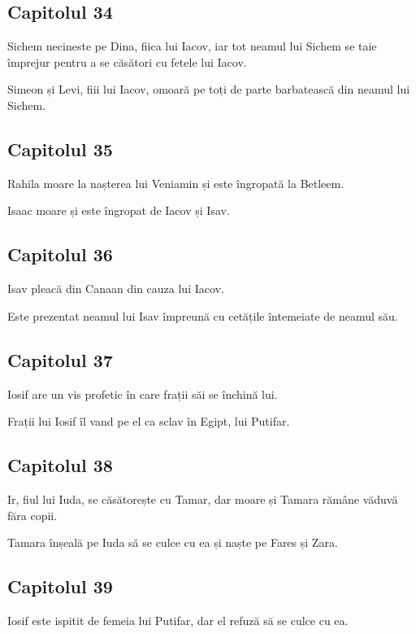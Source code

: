 \documentclass[12pt,a4paper]{article}
\begin{document}
\subsection{Capitolul 34}

Sichem necineste pe Dina, fiica lui Iacov, iar tot neamul lui Sichem se taie împrejur pentru a se căsători cu fetele lui Iacov.

Simeon și Levi, fiii lui Iacov, omoară pe toți de parte barbatească din neamul lui Sichem.

\subsection{Capitolul 35}

Rahila moare la nașterea lui Veniamin și este îngropată la Betleem.

Isaac moare și este îngropat de Iacov și Isav.

\subsection{Capitolul 36}

Isav pleacă din Canaan din cauza lui Iacov.

Este prezentat neamul lui Isav împreună cu cetățile întemeiate de neamul său.

\subsection{Capitolul 37}

Iosif are un vis profetic în care frații săi se închină lui.

Frații lui Iosif îl vand pe el ca sclav în Egipt, lui Putifar.

\subsection{Capitolul 38}

Ir, fiul lui Iuda, se căsătorește cu Tamar, dar moare și Tamara rămâne văduvă făra copii.

Tamara înșeală pe Iuda să se culce cu ea și naște pe Fares și Zara.

\subsection{Capitolul 39}

Iosif este ispitit de femeia lui Putifar, dar el refuză să se culce cu ea.
\end{document}
